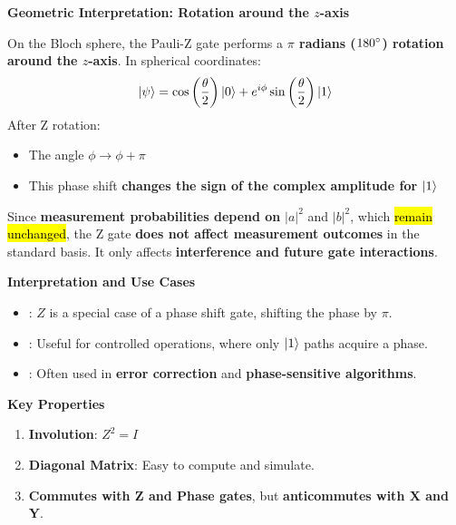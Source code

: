 \highspace
\begin{flushleft}
    \textcolor{Green3}{ \textbf{Geometric Interpretation: Rotation around the $z$-axis}}
\end{flushleft}
On the Bloch sphere, the Pauli-Z gate performs a \textbf{$\pi$ radians ($180\degree$) rotation around the $z$-axis}. In spherical coordinates:
\begin{equation*}
    | \psi \rangle = \cos\left(\dfrac{\theta}{2}\right)| 0 \rangle + e^{i \phi} \sin\left(\dfrac{\theta}{2}\right)| 1 \rangle
\end{equation*}
After Z rotation:
\begin{itemize}
    \item The angle $\phi \rightarrow \phi + \pi$
    \item This phase shift \textbf{changes the sign of the complex amplitude for} $| 1 \rangle$
\end{itemize}
Since \textbf{measurement probabilities depend on} $\left|a\right|^{2}$ and $\left|b\right|^{2}$, which \hl{remain unchanged}, the Z gate \textbf{does not affect measurement outcomes} in the standard basis. It only affects \textbf{interference and future gate interactions}.

\highspace
\begin{flushleft}
    \textcolor{Green3}{ \textbf{Interpretation and Use Cases}}
\end{flushleft}
\begin{itemize}
    \item {}: $Z$ is a special case of a phase shift gate, shifting the phase by $\pi$.
    \item {}: Useful for controlled operations, where only $| 1 \rangle$ paths acquire a phase.
    \item {}: Often used in \textbf{error correction} and \textbf{phase-sensitive algorithms}.
\end{itemize}

\highspace
\begin{flushleft}
    \textcolor{Green3}{ \textbf{Key Properties}}
\end{flushleft}
\begin{enumerate}
    \item \textbf{Involution}: $Z^{2} = I$
    \item \textbf{Diagonal Matrix}: Easy to compute and simulate.
    \item \textbf{Commutes with Z and Phase gates}, but \textbf{anticommutes with X and Y}.
\end{enumerate}